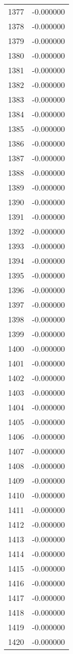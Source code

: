 \documentclass[12pt]{article}
\begin{document}
\begin{longtable}{@{}cc@{}}
1377 & -0.000000 \\
1378 & -0.000000 \\
1379 & -0.000000 \\
1380 & -0.000000 \\
1381 & -0.000000 \\
1382 & -0.000000 \\
1383 & -0.000000 \\
1384 & -0.000000 \\
1385 & -0.000000 \\
1386 & -0.000000 \\
1387 & -0.000000 \\
1388 & -0.000000 \\
1389 & -0.000000 \\
1390 & -0.000000 \\
1391 & -0.000000 \\
1392 & -0.000000 \\
1393 & -0.000000 \\
1394 & -0.000000 \\
1395 & -0.000000 \\
1396 & -0.000000 \\
1397 & -0.000000 \\
1398 & -0.000000 \\
1399 & -0.000000 \\
1400 & -0.000000 \\
1401 & -0.000000 \\
1402 & -0.000000 \\
1403 & -0.000000 \\
1404 & -0.000000 \\
1405 & -0.000000 \\
1406 & -0.000000 \\
1407 & -0.000000 \\
1408 & -0.000000 \\
1409 & -0.000000 \\
1410 & -0.000000 \\
1411 & -0.000000 \\
1412 & -0.000000 \\
1413 & -0.000000 \\
1414 & -0.000000 \\
1415 & -0.000000 \\
1416 & -0.000000 \\
1417 & -0.000000 \\
1418 & -0.000000 \\
1419 & -0.000000 \\
1420 & -0.000000 \\

\end{longtable}
\end{document}
